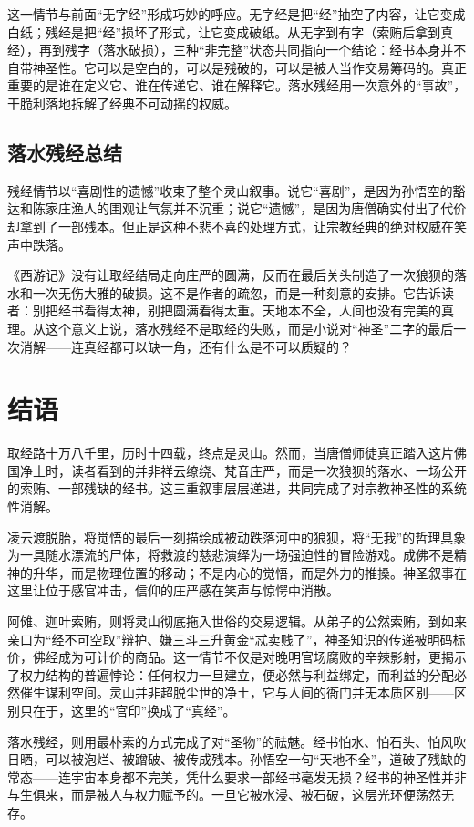 \documentclass{ctexart}
\begin{document}
这一情节与前面“无字经”形成巧妙的呼应。无字经是把“经”抽空了内容，让它变成白纸；残经是把“经”损坏了形式，让它变成破纸。从无字到有字（索贿后拿到真经），再到残字（落水破损），三种“非完整”状态共同指向一个结论：经书本身并不自带神圣性。它可以是空白的，可以是残破的，可以是被人当作交易筹码的。真正重要的是谁在定义它、谁在传递它、谁在解释它。落水残经用一次意外的“事故”，干脆利落地拆解了经典不可动摇的权威。

\subsection{落水残经总结}

残经情节以“喜剧性的遗憾”收束了整个灵山叙事。说它“喜剧”，是因为孙悟空的豁达和陈家庄渔人的围观让气氛并不沉重；说它“遗憾”，是因为唐僧确实付出了代价却拿到了一部残本。但正是这种不悲不喜的处理方式，让宗教经典的绝对权威在笑声中跌落。

《西游记》没有让取经结局走向庄严的圆满，反而在最后关头制造了一次狼狈的落水和一次无伤大雅的破损。这不是作者的疏忽，而是一种刻意的安排。它告诉读者：别把经书看得太神，别把圆满看得太重。天地本不全，人间也没有完美的真理。从这个意义上说，落水残经不是取经的失败，而是小说对“神圣”二字的最后一次消解——连真经都可以缺一角，还有什么是不可以质疑的？

\section{结语}

取经路十万八千里，历时十四载，终点是灵山。然而，当唐僧师徒真正踏入这片佛国净土时，读者看到的并非祥云缭绕、梵音庄严，而是一次狼狈的落水、一场公开的索贿、一部残缺的经书。这三重叙事层层递进，共同完成了对宗教神圣性的系统性消解。

凌云渡脱胎，将觉悟的最后一刻描绘成被动跌落河中的狼狈，将“无我”的哲理具象为一具随水漂流的尸体，将救渡的慈悲演绎为一场强迫性的冒险游戏。成佛不是精神的升华，而是物理位置的移动；不是内心的觉悟，而是外力的推搡。神圣叙事在这里让位于感官冲击，信仰的庄严感在笑声与惊愕中消散。

阿傩、迦叶索贿，则将灵山彻底拖入世俗的交易逻辑。从弟子的公然索贿，到如来亲口为“经不可空取”辩护、嫌三斗三升黄金“忒卖贱了”，神圣知识的传递被明码标价，佛经成为可计价的商品。这一情节不仅是对晚明官场腐败的辛辣影射，更揭示了权力结构的普遍悖论：任何权力一旦建立，便必然与利益绑定，而利益的分配必然催生谋利空间。灵山并非超脱尘世的净土，它与人间的衙门并无本质区别——区别只在于，这里的“官印”换成了“真经”。

落水残经，则用最朴素的方式完成了对“圣物”的祛魅。经书怕水、怕石头、怕风吹日晒，可以被泡烂、被蹭破、被传成残本。孙悟空一句“天地不全”，道破了残缺的常态——连宇宙本身都不完美，凭什么要求一部经书毫发无损？经书的神圣性并非与生俱来，而是被人与权力赋予的。一旦它被水浸、被石破，这层光环便荡然无存。
\end{document}
